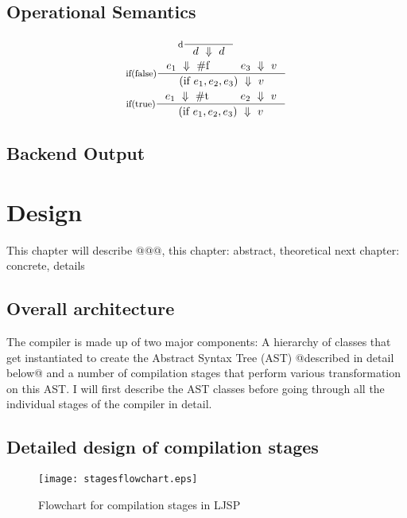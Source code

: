 \documentclass[11pt]{report}
\begin{document}
\section{Operational Semantics}
\begin{gather*}
\inference[d]{}{d~\Downarrow~d} \\
\inference[if(false)]{e_1~\Downarrow~\text{\#f}\hspace{1cm}e_3~\Downarrow~v}{(\text{if}\ e_1, e_2, e_3)~\Downarrow~v}\\
\inference[if(true)]{e_1~\Downarrow~\text{\#t}\hspace{1cm}e_2~\Downarrow~v}{(\text{if}\ e_1, e_2, e_3)~\Downarrow~v}
\end{gather*}

\section{Backend Output}

\chapter{Design}
This chapter will describe @@@, this chapter: abstract, theoretical next chapter: concrete, details
\section{Overall architecture}
The compiler is made up of two major components: A hierarchy of classes that get instantiated to create the Abstract Syntax Tree (AST) @described in detail below@ and a number of compilation stages that perform various transformation on this AST. I will first describe the AST classes before going through all the individual stages of the compiler in detail.
\section{Detailed design of compilation stages}

\begin{figure}[ht]
\begin{center}
\texttt{[image: stagesflowchart.eps]}
\caption{Flowchart for compilation stages in LJSP}
\end{center}
\label{stagesflowchart}
\end{figure}
\end{document}
